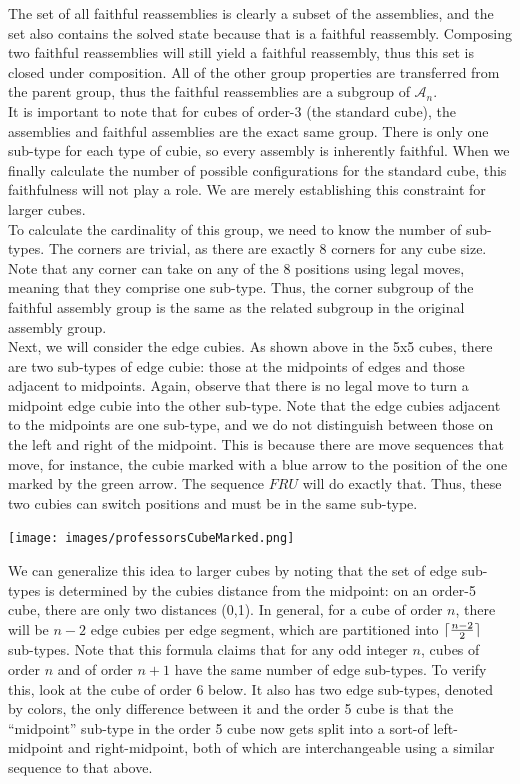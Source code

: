 \documentclass[10pt,letterpaper]{report}
\DeclarePairedDelimiter\ceil{\lceil}{\rceil}
\begin{document}
The set of all faithful reassemblies is clearly a subset of the assemblies, and the set also contains the solved state because that is a faithful reassembly.  Composing two faithful reassemblies will still yield a faithful reassembly, thus this set is closed under composition.  All of the other group properties are transferred from the parent group, thus the faithful reassemblies are a subgroup of $\mathcal{A}_n$. \\

It is important to note that for cubes of order-3 (the standard cube), the assemblies and faithful assemblies are the exact same group.  There is only one sub-type for each type of cubie, so every assembly is inherently faithful.  When we finally calculate the number of possible configurations for the standard cube, this faithfulness will not play a role.  We are merely establishing this constraint for larger cubes. \\

To calculate the cardinality of this group, we need to know the number of sub-types.  The corners are trivial, as there are exactly 8 corners for any cube size.  Note that any corner can take on any of the 8 positions using legal moves, meaning that they comprise one sub-type.  Thus, the corner subgroup of the faithful assembly group is the same as the related subgroup in the original assembly group. \\

Next, we will consider the edge cubies.  As shown above in the 5x5 cubes, there are two sub-types of edge cubie: those at the midpoints of edges and those adjacent to midpoints.  Again, observe that there is no legal move to turn a midpoint edge cubie into the other sub-type.  Note that the edge cubies adjacent to the midpoints are one sub-type, and we do not distinguish between those on the left and right of the midpoint.  This is because there are move sequences that move, for instance, the cubie marked with a blue arrow to the position of the one marked by the green arrow.  The sequence $FRU$ will do exactly that.  Thus, these two cubies can switch positions and must be in the same sub-type.

\begin{center}
\texttt{[image: images/professorsCubeMarked.png]} 
\end{center}

We can generalize this idea to larger cubes by noting that the set of edge sub-types is determined by the cubies distance from the midpoint: on an order-5 cube, there are only two distances (0,1).  In general, for a cube of order $n$, there will be $n-2$ edge cubies per edge segment, which are partitioned into $\ceil{\frac{n-2}{2}}$ sub-types.  Note that this formula claims that for any odd integer $n$, cubes of order $n$ and of order $n+1$ have the same number of edge sub-types.  To verify this, look at the cube of order 6 below.  It also has two edge sub-types, denoted by colors, the only difference between it and the order 5 cube is that the ``midpoint'' sub-type in the order 5 cube now gets split into a sort-of left-midpoint and right-midpoint, both of which are interchangeable using a similar sequence to that above.
\end{document}
